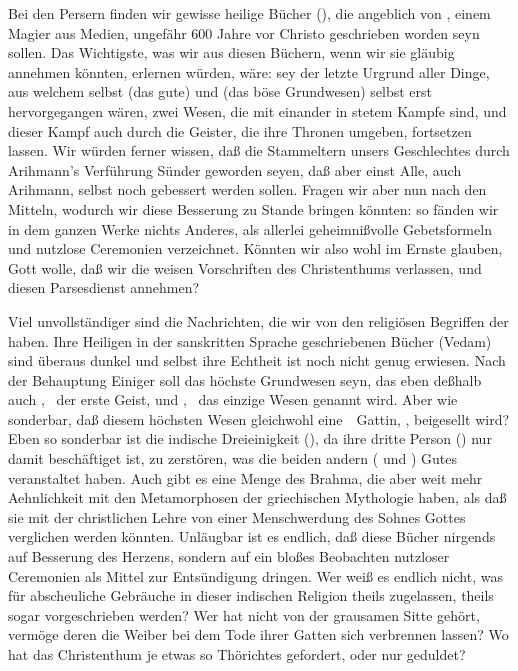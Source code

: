 \begin{aufza}
\item Bei den Persern finden wir gewisse heilige Bücher (), die angeblich von , einem Magier aus Medien, ungefähr 600 Jahre vor Christo geschrieben worden seyn sollen. Das Wichtigste, was wir aus diesen Büchern, wenn wir sie gläubig annehmen könnten, erlernen würden, wäre:  sey der letzte Urgrund aller Dinge, aus welchem selbst  (das gute) und  (das böse Grundwesen) selbst erst hervorgegangen wären, zwei Wesen, die mit einander in stetem Kampfe sind, und dieser Kampf auch durch die Geister, die ihre Thronen umgeben, fortsetzen lassen. Wir würden ferner wissen, daß die Stammeltern unsers Geschlechtes durch Arihmann's Verführung Sünder geworden seyen, daß aber einst Alle, auch Arihmann, selbst noch gebessert werden sollen. Fragen wir aber nun nach den Mitteln, wodurch wir diese Besserung zu Stande bringen könnten: so fänden wir in dem ganzen Werke nichts Anderes, als allerlei geheimnißvolle Gebetsformeln und nutzlose Ceremonien verzeichnet. Könnten wir also wohl im Ernste glauben, Gott wolle, daß wir die weisen Vorschriften des Christenthums verlassen, und diesen Parsesdienst annehmen?
\item Viel unvollständiger sind die Nachrichten, die wir von den religiösen Begriffen der  haben. Ihre Heiligen in der sanskritten Sprache geschriebenen Bücher (Vedam) sind überaus dunkel und selbst ihre Echtheit ist noch nicht genug erwiesen. Nach der Behauptung Einiger soll  das höchste Grundwesen seyn, das eben deßhalb auch , \di\ der erste Geist, und , \di\ das einzige Wesen genannt wird. Aber wie sonderbar, daß diesem höchsten Wesen gleichwohl eine~\ Gattin, , beigesellt wird? Eben so sonderbar ist die indische Dreieinigkeit (), da ihre dritte Person () nur damit beschäftiget ist, zu zerstören, was die beiden andern ( und ) Gutes veranstaltet haben. Auch gibt es eine Menge  des Brahma, die aber weit mehr Aehnlichkeit mit den Metamorphosen der griechischen Mythologie haben, als daß sie mit der christlichen Lehre von einer Menschwerdung des Sohnes Gottes verglichen werden könnten. Unläugbar ist es endlich, daß diese Bücher nirgends auf Besserung des Herzens, sondern auf ein bloßes Beobachten nutzloser Ceremonien als Mittel zur Entsündigung dringen. Wer weiß es endlich nicht, was für abscheuliche Gebräuche in dieser indischen Religion theils zugelassen, theils sogar vorgeschrieben werden? Wer hat nicht von der grausamen Sitte gehört, vermöge deren die Weiber bei dem Tode ihrer Gatten sich verbrennen lassen? Wo hat das Christenthum je etwas so Thörichtes gefordert, oder nur geduldet?

\end{aufza}
